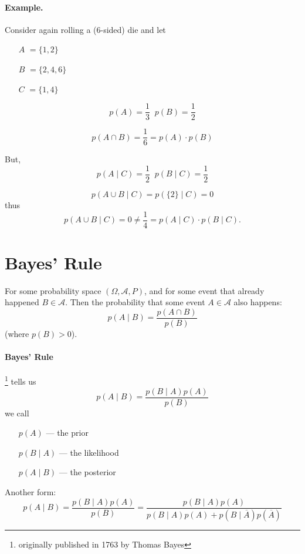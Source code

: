 \paragraph{Example.} 
Consider again rolling a (6-sided) die and let 
\begin{itemize}
\item[$A$] $=\{1,2\}$
\item[$B$] $=\{2,4,6\}$
\item[$C$] $=\{1,4\}$
\end{itemize}

\[p(A) = \frac{1}{3} \;\; p(B)=\frac{1}{2}\]

\[p(A\cap B) = \frac{1}{6} = p(A)\cdot p(B)\]

But, 
\[p(A\mid C) = \frac{1}{2} \;\; p(B\mid C)=\frac{1}{2}\]

\[p(A\cup B\mid C) = p(\{2\}\mid C) = 0\]
thus 
\[p(A\cup B \mid C) = 0 \ne \frac{1}{4} = p(A\mid C) \cdot p(B\mid C).\]

\section{Bayes' Rule}

For some probability space $(\Omega, \mathcal{A}, P)$, and for some event that already happened $B\in\mathcal{A}.$
Then the probability that some event $A\in\mathcal{A}$ also happens:
\[p(A\mid B) = \frac{p(A\cap B)}{p(B)}\]
(where $p(B)>0$). 

\paragraph{Bayes' Rule}\footnote{originally published in 1763 by Thomas Bayes} tells us
\[p(A\mid B) = \frac{p(B\mid A)p(A)}{p(B)}\]
we call 
\begin{itemize}
\item[]$p(A)$ --- the prior
\item[]$p(B\mid A)$ --- the likelihood
\item[]$p(A\mid B)$ --- the posterior 
\end{itemize}

Another form:
\[p(A\mid B) = \frac{p(B\mid A)p(A)}{p(B)} = \frac{p(B\mid A)p(A)}{p(B\mid A)p(A) + p(B\mid \overline A)p(\overline A)}\]

